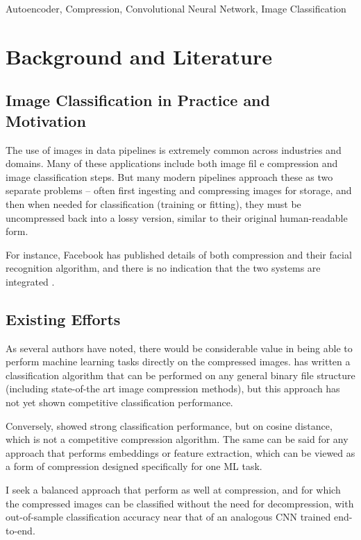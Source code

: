\documentclass[twoside,11pt]{article}
\begin{document}
\begin{keywords}
    Autoencoder, Compression, Convolutional Neural Network, Image Classification
\end{keywords}




\section{Background and Literature}

\subsection{Image Classification in Practice and Motivation}
The use of images in data pipelines is extremely common across industries and 
domains. Many of these applications include both image fil      e compression and 
image classification steps. But many modern pipelines approach these as two 
separate problems – often first ingesting and compressing
images for storage, and then when needed for classification 
(training or fitting), they must be uncompressed back into a lossy version, 
similar to their original human-readable form.

 For instance, Facebook has published details of both compression and their 
facial recognition algorithm, and there is no indication that the two systems 
are integrated \citep{collet2016zstandard, taigman2014deepface}.

\subsection{Existing Efforts}

As several authors have noted, 
there would be considerable value in being able to perform machine learning 
tasks directly on the compressed images. \citet{needell2017} has written a classification 
algorithm that can be performed on any general binary file structure (including 
state-of-the art image compression methods), but this approach has not yet shown
 competitive classification performance. 

Conversely, \citet{fu2016} showed strong 
classification performance, but on cosine distance, which is not a competitive 
compression algorithm. The same can be said for any approach that performs 
embeddings or feature extraction, which can be viewed as a form of compression 
designed specifically for one ML task.

I seek a balanced approach that perform as well at compression,
and for which the compressed images 
can be classified without the need for decompression, with out-of-sample
 classification accuracy near that of an analogous CNN trained end-to-end.
\end{document}

